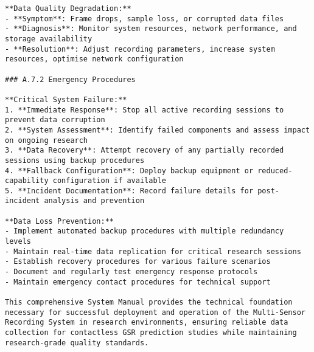 \begin{verbatim}
**Data Quality Degradation:**
- **Symptom**: Frame drops, sample loss, or corrupted data files
- **Diagnosis**: Monitor system resources, network performance, and storage availability
- **Resolution**: Adjust recording parameters, increase system resources, optimise network configuration

### A.7.2 Emergency Procedures

**Critical System Failure:**
1. **Immediate Response**: Stop all active recording sessions to prevent data corruption
2. **System Assessment**: Identify failed components and assess impact on ongoing research
3. **Data Recovery**: Attempt recovery of any partially recorded sessions using backup procedures
4. **Fallback Configuration**: Deploy backup equipment or reduced-capability configuration if available
5. **Incident Documentation**: Record failure details for post-incident analysis and prevention

**Data Loss Prevention:**
- Implement automated backup procedures with multiple redundancy levels
- Maintain real-time data replication for critical research sessions
- Establish recovery procedures for various failure scenarios
- Document and regularly test emergency response protocols
- Maintain emergency contact procedures for technical support

This comprehensive System Manual provides the technical foundation necessary for successful deployment and operation of the Multi-Sensor Recording System in research environments, ensuring reliable data collection for contactless GSR prediction studies while maintaining research-grade quality standards.
\end{verbatim}
